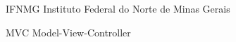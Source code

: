 
\begin{siglas}
  \item[IFNMG] Instituto Federal do Norte de Minas Gerais
  \item [MVC] Model-View-Controller
\end{siglas}